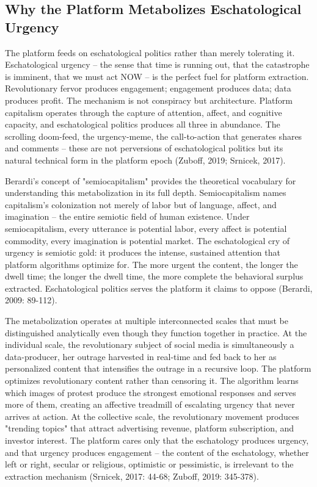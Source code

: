 \subsection{Why the Platform Metabolizes Eschatological Urgency}

The platform feeds on eschatological politics rather than merely tolerating it. Eschatological urgency -- the sense that time is running out, that the catastrophe is imminent, that we must act NOW -- is the perfect fuel for platform extraction. Revolutionary fervor produces engagement; engagement produces data; data produces profit. The mechanism is not conspiracy but architecture. Platform capitalism operates through the capture of attention, affect, and cognitive capacity, and eschatological politics produces all three in abundance. The scrolling doom-feed, the urgency-meme, the call-to-action that generates shares and comments -- these are not perversions of eschatological politics but its natural technical form in the platform epoch (Zuboff, 2019; Srnicek, 2017).

Berardi's concept of "semiocapitalism" provides the theoretical vocabulary for understanding this metabolization in its full depth. Semiocapitalism names capitalism's colonization not merely of labor but of language, affect, and imagination -- the entire semiotic field of human existence. Under semiocapitalism, every utterance is potential labor, every affect is potential commodity, every imagination is potential market. The eschatological cry of urgency is semiotic gold: it produces the intense, sustained attention that platform algorithms optimize for. The more urgent the content, the longer the dwell time; the longer the dwell time, the more complete the behavioral surplus extracted. Eschatological politics serves the platform it claims to oppose (Berardi, 2009: 89-112).

The metabolization operates at multiple interconnected scales that must be distinguished analytically even though they function together in practice. At the individual scale, the revolutionary subject of social media is simultaneously a data-producer, her outrage harvested in real-time and fed back to her as personalized content that intensifies the outrage in a recursive loop. The platform optimizes revolutionary content rather than censoring it. The algorithm learns which images of protest produce the strongest emotional responses and serves more of them, creating an affective treadmill of escalating urgency that never arrives at action. At the collective scale, the revolutionary movement produces "trending topics" that attract advertising revenue, platform subscription, and investor interest. The platform cares only that the eschatology produces urgency, and that urgency produces engagement -- the content of the eschatology, whether left or right, secular or religious, optimistic or pessimistic, is irrelevant to the extraction mechanism (Srnicek, 2017: 44-68; Zuboff, 2019: 345-378).

